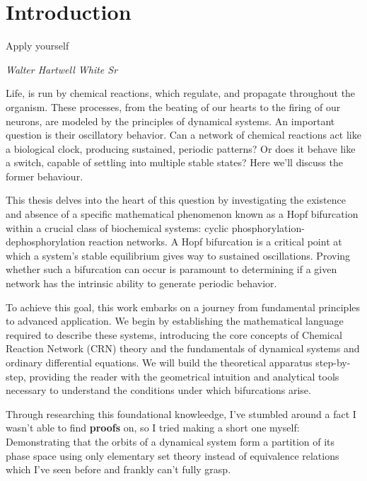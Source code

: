 \chapter{Introduction}
\epigraph{Apply yourself}{\textit{Walter Hartwell White Sr}}

\label{intro}

Life, is run by chemical reactions, which regulate, and propagate throughout the organism. These processes, from the beating of our hearts to the firing of our neurons, are modeled by the principles of dynamical systems. An important question is their oscillatory behavior. Can a network of chemical reactions act like a biological clock, producing sustained, periodic patterns? Or does it behave like a switch, capable of settling into multiple stable states? Here we'll discuss the former behaviour.

This thesis delves into the heart of this question by investigating the existence and absence of a specific mathematical phenomenon known as a Hopf bifurcation within a crucial class of biochemical systems: cyclic phosphorylation-dephosphorylation reaction networks. A Hopf bifurcation is a critical point at which a system's stable equilibrium gives way to sustained oscillations. Proving whether such a bifurcation can occur is paramount to determining if a given network has the intrinsic ability to generate periodic behavior.

To achieve this goal, this work embarks on a journey from fundamental principles to advanced application. We begin by establishing the mathematical language required to describe these systems, introducing the core concepts of Chemical Reaction Network (CRN) theory and the fundamentals of dynamical systems and ordinary differential equations. We will build the theoretical apparatus step-by-step, providing the reader with the geometrical intuition and analytical tools necessary to understand the conditions under which bifurcations arise.

Through researching this foundational knowleedge, I've stumbled around a fact I wasn't able to find \textbf{ proofs } on, so I tried making a short one myself: Demonstrating that the orbits of a dynamical system form a partition of its phase space using only elementary set theory instead of equivalence relations which I've seen before and frankly can't fully grasp.

